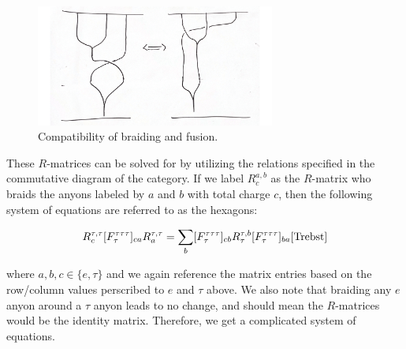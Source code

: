 \documentclass[10pt]{ucthesis}
\begin{document}
\begin{figure}[H]
	\centering
	\includegraphics[width=0.7\textwidth]{fusethrubraid.png}
	\caption{Compatibility of braiding and fusion.}
\end{figure}


These $R$-matrices can be solved for by utilizing the relations specified in the commutative diagram of the category. If we label $R^{a,b}_c$ as the $R$-matrix who braids the anyons labeled by $a$ and $b$ with total charge $c$, then the following system of equations are referred to as the hexagons:

\begin{equation}
	\begin{aligned}
		R^{\tau,\tau}_c [F^{\tau\tau\tau}_\tau]_{ca}R^{\tau,\tau}_a = \sum_b [F^{\tau\tau\tau}_\tau]_{cb}R^{\tau,b}_\tau[F^{\tau\tau\tau}_\tau]_{ba} \cite{Trebst}
	\end{aligned}
\end{equation}

where $a,b,c\in\{e,\tau\}$ and we again reference the matrix entries based on the row/column values perscribed to $e$ and $\tau$ above. We also note that braiding any $e$ anyon around a $\tau$ anyon leads to no change, and should mean the $R$-matrices would be the identity matrix. Therefore, we get a complicated system of equations.
\end{document}
